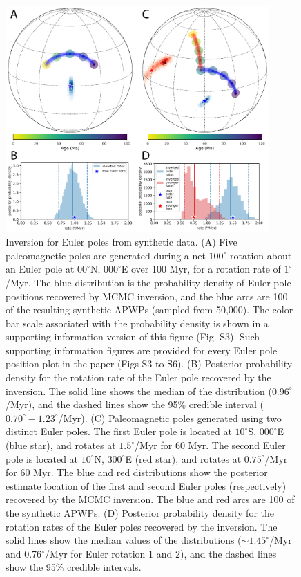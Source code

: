 \documentclass[]{agujournal2019}
\begin{document}
\begin{figure}
\centering
\includegraphics[width=0.9\textwidth]{fig_synthetic_pep.png}
\caption{Inversion for Euler poles from synthetic data. (A) Five paleomagnetic poles are generated during a net $100^\circ$ rotation about an Euler pole at $00^\circ$N, $000^\circ$E over 100 Myr, for a rotation rate of $1^\circ$/Myr. The blue distribution is the probability density of Euler pole positions recovered by MCMC inversion, and the blue arcs are 100 of the resulting synthetic APWPs (sampled from 50,000). The color bar scale associated with the probability density is shown in a supporting information version of this figure (Fig. S3). Such supporting information figures are provided for every Euler pole position plot in the paper (Figs S3 to S6). (B) Posterior probability density for the rotation rate of the Euler pole recovered by the inversion. The solid line shows the median of the distribution ($0.96^\circ$/Myr), and the dashed lines show the 95\% credible interval ($0.70^\circ-1.23^\circ$/Myr). (C) Paleomagnetic poles generated using two distinct Euler poles. The first Euler pole is located at $10^\circ$S, $000^\circ$E (blue star), and rotates at $1.5^\circ$/Myr for 60 Myr. The second Euler pole is located at $10^\circ$N, $300^\circ$E (red star), and rotates at $0.75^\circ$/Myr for 60 Myr. The blue and red distributions show the posterior estimate location of the first and second Euler poles (respectively) recovered by the MCMC inversion. The blue and red arcs are 100 of the synthetic APWPs. (D) Posterior probability density for the rotation rates of the Euler poles recovered by the inversion. The solid lines show the median values of the distributions ($\sim1.45^\circ$/Myr and 0.76$^\circ$/Myr for Euler rotation 1 and 2), and the dashed lines show the 95\% credible intervals.}
\label{fig:synthetic_pep}
\end{figure}
\end{document}
